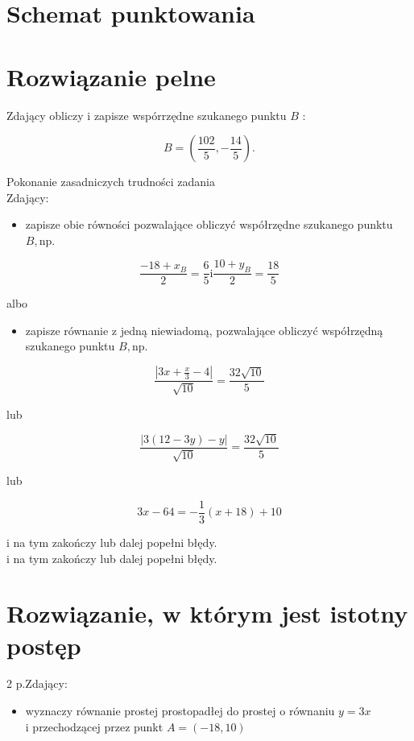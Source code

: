 \documentclass[10pt]{article}
\begin{document}
\section*{Schemat punktowania}
\section*{Rozwiązanie pelne}
Zdający obliczy i zapisze wspórrzędne szukanego punktu $B$ :

$$
B=\left(\frac{102}{5},-\frac{14}{5}\right) .
$$

Pokonanie zasadniczych trudności zadania\\
Zdający:

\begin{itemize}
  \item zapisze obie równości pozwalające obliczyć współrzędne szukanego punktu $B, \mathrm{np}$.
\end{itemize}

$$
\frac{-18+x_{B}}{2}=\frac{6}{5} \mathrm{i} \frac{10+y_{B}}{2}=\frac{18}{5}
$$

albo

\begin{itemize}
  \item zapisze równanie z jedną niewiadomą, pozwalające obliczyć współrzędną szukanego punktu $B, \mathrm{np}$.
\end{itemize}

$$
\frac{\left|3 x+\frac{x}{3}-4\right|}{\sqrt{10}}=\frac{32 \sqrt{10}}{5}
$$

lub

$$
\frac{|3(12-3 y)-y|}{\sqrt{10}}=\frac{32 \sqrt{10}}{5}
$$

lub

$$
3 x-64=-\frac{1}{3}(x+18)+10
$$

i na tym zakończy lub dalej popełni błędy.\\
i na tym zakończy lub dalej popełni błędy.

\section*{Rozwiązanie, w którym jest istotny postęp}
 2 p.Zdający:

\begin{itemize}
  \item wyznaczy równanie prostej prostopadłej do prostej o równaniu $y=3 x$\\
i przechodzącej przez punkt $A=(-18,10)$
\end{itemize}
\end{document}
